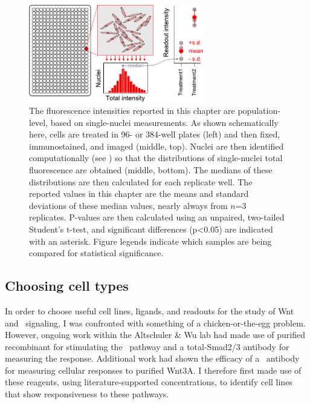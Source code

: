  \begin{figure}[!bt]
  \centering
  \includegraphics[width=3in]{FIGS/insulation/measurementSchematic.pdf}
  {\singlespacing 
  \caption[Schematic of the population-level fluorescence metric.]
        { 
        The fluorescence intensities reported in this
        chapter are population-level, based on single-nuclei
        measurements. As shown schematically here,
        cells are treated in
        96- or 384-well plates (left) and then fixed, immunostained,
        and imaged (middle, top).
        Nuclei are then identified computationally
        (see ) so that the distributions
        of single-nuclei total fluorescence are obtained
        (middle, bottom). The medians of these distributions are
        then calculated for each replicate well. The reported
        values in this chapter are the means and standard deviations
        of these median values, nearly always from $n$=3 replicates.
        P-values are then calculated using an unpaired, two-tailed
        Student's t-test, and significant differences (p<0.05) are
        indicated with an asterisk. Figure legends indicate
        which samples are being compared for
        statistical significance.
        }
  \label{insulation:system:measurement}}
  \end{figure}
  

\subsection{Choosing cell types}
\label{insulation:system:readouts}


In order to choose useful cell lines, ligands, and readouts
for the study of Wnt and \tgfbsf\ signaling, I was confronted
with something of a chicken-or-the-egg problem. However, ongoing work
within the Altschuler \& Wu 
lab had made use of purified recombinant  for stimulating
the \tgf\ pathway and a total-Smad2/3 antibody for measuring the response.
Additional work had shown the efficacy of a \bcat\ antibody for
measuring cellular responses to purified Wnt3A. I therefore first made
use of these reagents, using literature-supported concentrations,
to identify cell lines that show responsiveness
to these pathways.



